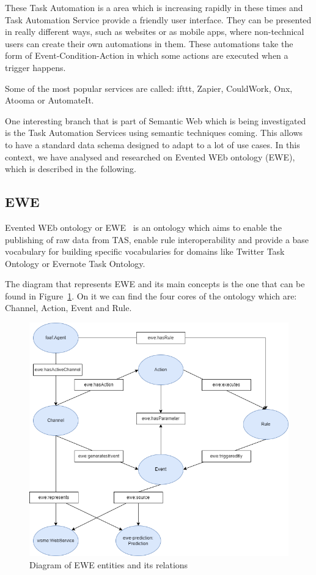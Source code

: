 These Task Automation is a area which is increasing rapidly in these times and Task Automation Service provide a friendly user interface. They can be presented in really different ways, such as websites or as mobile apps, where non-technical users can create their own automations in them. These automations take the form of Event-Condition-Action in which some actions are executed when a trigger happens. 

Some of the most popular services are called: ifttt, Zapier, CouldWork, Onx, Atooma or AutomateIt.

One interesting branch that is part of Semantic Web which is being investigated~\cite{electronics9081194} is the Task Automation Services using semantic techniques coming. This allows to have a standard data schema designed to adapt to a lot of use cases. In this context, we have analysed and researched on Evented WEb ontology (EWE), which is described in the following.

\subsection{EWE}
Evented WEb ontology or EWE~\cite{EWEOntol89:online} is an ontology which aims to enable the publishing of raw data from TAS, enable rule interoperability and provide a base vocabulary for building specific vocabularies for domains like Twitter Task Ontology or Evernote Task Ontology.

The diagram that represents EWE and its main concepts is the one that can be found in Figure~\ref{fig:ewediagram}. On it we can find the four cores of the ontology which are: Channel, Action, Event and Rule. 

\begin{figure}[!htp]
    \centering
    \includegraphics[scale=0.5]{img/state-of-art/EWEdiagram.png}
    \caption{Diagram of EWE entities and its relations}
    \label{fig:ewediagram}
\end{figure}

